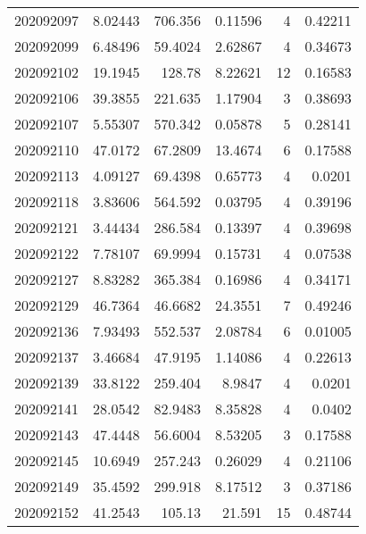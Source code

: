 \begin{tabular}{rrrrrr}
 202092097 &          8.02443 &      706.356  &            0.11596 &           4 & 0.42211 \\
 202092099 &          6.48496 &       59.4024 &            2.62867 &           4 & 0.34673 \\
 202092102 &         19.1945  &      128.78   &            8.22621 &          12 & 0.16583 \\
 202092106 &         39.3855  &      221.635  &            1.17904 &           3 & 0.38693 \\
 202092107 &          5.55307 &      570.342  &            0.05878 &           5 & 0.28141 \\
 202092110 &         47.0172  &       67.2809 &           13.4674  &           6 & 0.17588 \\
 202092113 &          4.09127 &       69.4398 &            0.65773 &           4 & 0.0201  \\
 202092118 &          3.83606 &      564.592  &            0.03795 &           4 & 0.39196 \\
 202092121 &          3.44434 &      286.584  &            0.13397 &           4 & 0.39698 \\
 202092122 &          7.78107 &       69.9994 &            0.15731 &           4 & 0.07538 \\
 202092127 &          8.83282 &      365.384  &            0.16986 &           4 & 0.34171 \\
 202092129 &         46.7364  &       46.6682 &           24.3551  &           7 & 0.49246 \\
 202092136 &          7.93493 &      552.537  &            2.08784 &           6 & 0.01005 \\
 202092137 &          3.46684 &       47.9195 &            1.14086 &           4 & 0.22613 \\
 202092139 &         33.8122  &      259.404  &            8.9847  &           4 & 0.0201  \\
 202092141 &         28.0542  &       82.9483 &            8.35828 &           4 & 0.0402  \\
 202092143 &         47.4448  &       56.6004 &            8.53205 &           3 & 0.17588 \\
 202092145 &         10.6949  &      257.243  &            0.26029 &           4 & 0.21106 \\
 202092149 &         35.4592  &      299.918  &            8.17512 &           3 & 0.37186 \\
 202092152 &         41.2543  &      105.13   &           21.591   &          15 & 0.48744 \\

\end{tabular}
